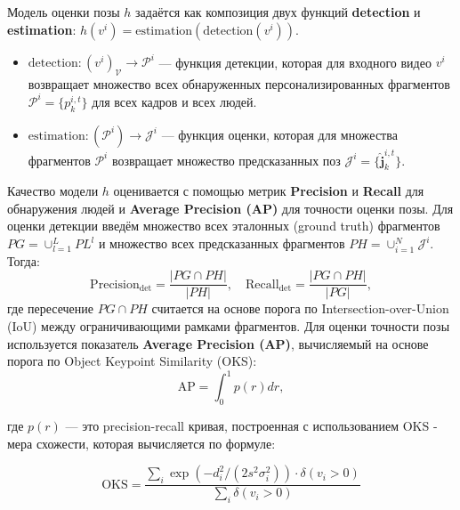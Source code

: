 \documentclass{article}
\begin{document}
Модель оценки позы $h$ задаётся как композиция двух функций \textbf{detection} и \textbf{estimation}: $h(v^i) = \mathrm{estimation}(\mathrm{detection}(v^i))$.
\begin{itemize}
    \item $\mathrm{detection}: (v^i)_{\mathcal{V}} \rightarrow \mathcal{P}^i$ — функция детекции, которая для входного видео $v^i$ возвращает множество всех обнаруженных персонализированных фрагментов $\mathcal{P}^i = \{ p^{i,t}_k \}$ для всех кадров и всех людей.
    \item $\mathrm{estimation}: (\mathcal{P}^i) \rightarrow \mathcal{J}^i$ — функция оценки, которая для множества фрагментов $\mathcal{P}^i$ возвращает множество предсказанных поз $\mathcal{J}^i = \{ \hat{\mathbf{j}}^{i,t}_k \}$.
\end{itemize}

Качество модели $h$ оценивается с помощью метрик \textbf{Precision} и \textbf{Recall} для обнаружения людей и \textbf{Average Precision (AP)} для точности оценки позы. Для оценки детекции введём множество всех эталонных (ground truth) фрагментов $PG = \cup_{l=1}^L PL^l$ и множество всех предсказанных фрагментов $PH = \cup_{i=1}^N \mathcal{J}^i$. Тогда:
\[
\mathrm{Precision}_{\mathrm{det}} = \frac{|PG \cap PH|}{|PH|}, \quad \mathrm{Recall}_{\mathrm{det}} = \frac{|PG \cap PH|}{|PG|},
\]
где пересечение $PG \cap PH$ считается на основе порога по Intersection-over-Union (IoU) между ограничивающими рамками фрагментов. Для оценки точности позы используется показатель \textbf{Average Precision (AP)}, вычисляемый на основе порога по Object Keypoint Similarity (OKS):
\[
\mathrm{AP} = \int_0^1 p(r)  dr,
\]

где $p(r)$ — это precision-recall кривая, построенная с использованием OKS - мера схожести, которая вычисляется по формуле:

\[
\text{OKS} = \frac{\sum\limits_{i} \exp\left(-d_i^2 / (2s^2\sigma_i^2)\right) \cdot \delta(v_i > 0)}{\sum\limits_{i} \delta(v_i > 0)}
\]
\end{document}
